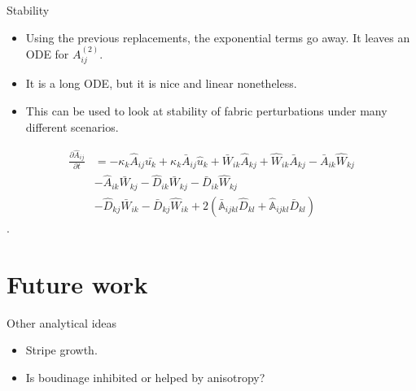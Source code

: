 \documentclass{beamer}
\begin{document}
\begin{frame}{Stability}
   \begin{itemize}
      \item Using the previous replacements, the exponential terms go away. It leaves an ODE for $A^{(2)}_{ij}$.
      \item It is a long ODE, but it is nice and linear nonetheless.
      \item This can be used to look at stability of fabric perturbations under many different scenarios.
   \end{itemize}
\begin{equation}
\begin{align*}
   \frac{\partial \hat{A}_{ij}}{\partial t} &= -\kappa_k \hat{A}_{ij} \bar{u_k} + \kappa_k \bar{A}_{ij} \hat{u}_k  + \bar{W}_{ik} \hat{A}_{kj} + \hat{W}_{ik} \bar{A}_{kj}  - \bar{A}_{ik} \hat{W}_{kj} 
  \\ 
   &- \hat{A}_{ik} \bar{W}_{kj} - \hat{D}_{ik}\bar{W}_{kj} - \bar{D}_{ik}\hat{W}_{kj} 
   \\ 
   & - \hat{D}_{kj}\bar{W}_{ik} - \bar{D}_{kj} \hat{W}_{ik} + 2 (\bar{\mathbb{A}}_{ijkl} \hat{D}_{kl} + \hat{\mathbb{A}}_{ijkl} \bar{D}_{kl})
\end{align*}
\end{equation}.
\end{frame}

\section{Future work}

\begin{frame}{Other analytical ideas}
   \begin{itemize}
      \item Stripe growth.
      \item Is boudinage inhibited or helped by anisotropy?
      
   \end{itemize}
\end{frame}
\end{document}
